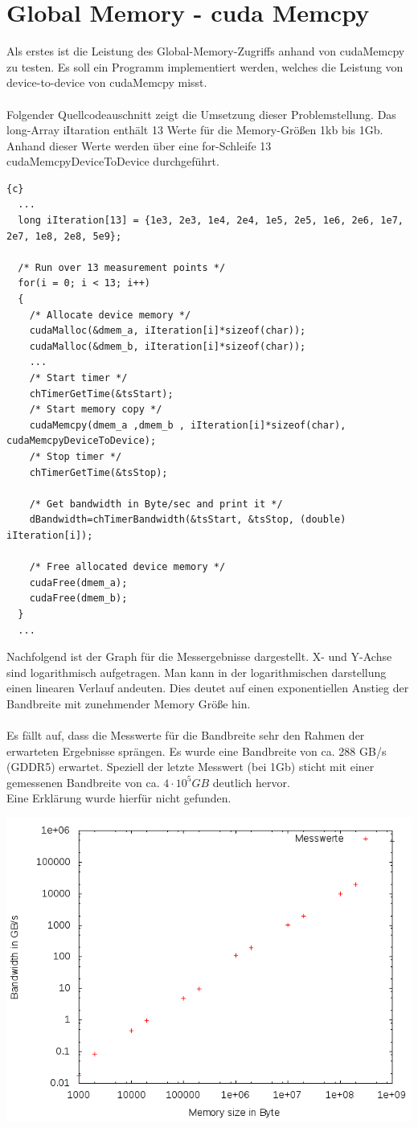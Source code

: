 \documentclass{article}
\newcommand{\enterProblemHeader}[1]{
}
\newcommand{\exitProblemHeader}[1]{
}
\newcounter{homeworkProblemCounter} %
\newcommand{\homeworkProblemName}{}
\newenvironment{homeworkProblem}[1][Problem \arabic{homeworkProblemCounter}]{ %
\stepcounter{homeworkProblemCounter} %
\renewcommand{\homeworkProblemName}{#1} %
\section{\homeworkProblemName} %
}{
}
\begin{document}
\begin{homeworkProblem}[Global Memory - cuda Memcpy]
Als erstes ist die Leistung des Global-Memory-Zugriffs anhand von cudaMemcpy zu testen.
Es soll ein Programm implementiert werden, welches die Leistung von device-to-device
von cudaMemcpy misst.
\\\\
Folgender Quellcodeauschnitt zeigt die Umsetzung dieser Problemstellung. Das long-Array
iItaration enthält 13 Werte für die Memory-Größen 1kb bis 1Gb. Anhand dieser Werte werden
über eine for-Schleife 13 cudaMemcpyDeviceToDevice durchgeführt.
\begin{lstlisting}{c}
  ...
  long iIteration[13] = {1e3, 2e3, 1e4, 2e4, 1e5, 2e5, 1e6, 2e6, 1e7, 2e7, 1e8, 2e8, 5e9};

  /* Run over 13 measurement points */
  for(i = 0; i < 13; i++)
  {
    /* Allocate device memory */
    cudaMalloc(&dmem_a, iIteration[i]*sizeof(char));
    cudaMalloc(&dmem_b, iIteration[i]*sizeof(char));
    ...
    /* Start timer */
    chTimerGetTime(&tsStart);
    /* Start memory copy */
    cudaMemcpy(dmem_a ,dmem_b , iIteration[i]*sizeof(char), cudaMemcpyDeviceToDevice);
    /* Stop timer */
    chTimerGetTime(&tsStop);

    /* Get bandwidth in Byte/sec and print it */
    dBandwidth=chTimerBandwidth(&tsStart, &tsStop, (double) iIteration[i]);

    /* Free allocated device memory */
    cudaFree(dmem_a);
    cudaFree(dmem_b);
  }
  ...
\end{lstlisting}
Nachfolgend ist der Graph für die Messergebnisse dargestellt. X- und Y-Achse sind
logarithmisch aufgetragen. Man kann in der logarithmischen darstellung einen linearen
Verlauf andeuten. Dies deutet auf einen exponentiellen Anstieg der Bandbreite mit
zunehmender Memory Größe hin.
\\\\
Es fällt auf, dass die Messwerte für die Bandbreite sehr den Rahmen der erwarteten
Ergebnisse sprängen. Es wurde eine Bandbreite von ca. 288 GB/s (GDDR5) erwartet.
Speziell der letzte Messwert (bei 1Gb) sticht mit einer gemessenen Bandbreite von 
ca. $ 4 \cdot 10^5 GB$ deutlich hervor.
\\
Eine Erklärung wurde hierfür nicht gefunden.
\begin{center}
\includegraphics[width=0.7\columnwidth]{../src/part_1/image.png}
\end{center}
\end{homeworkProblem}
\end{document}
